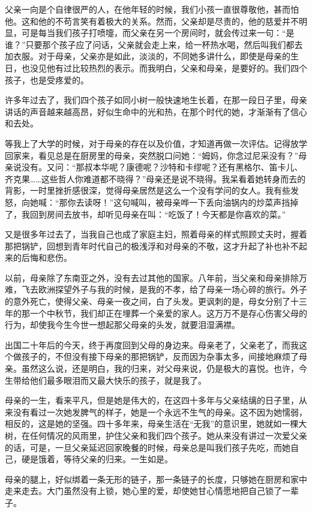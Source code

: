 \par 父亲一向是个自律很严的人，在他年轻的时候，我们小孩一直很尊敬他，甚而怕他。这和他的不苟言笑有着极大的关系。然而，父亲却是尽责的，他的慈爱并不明显，可是每当我们孩子打喷嚏，而父亲在另一个房间时，就会传过来一句：“是谁？”只要那个孩子应了问话，父亲就会走上来，给一杯热水喝，然后叫我们都去加衣服。对于母亲，父亲亦是如此，淡淡的，不同她多讲什么，即使是母亲的生日，也没见他有过比较热烈的表示。而我明白，父亲和母亲，是要好的。我们四个孩子，也是受疼爱的。
\par 许多年过去了，我们四个孩子如同小树一般快速地生长着，在那一段日子里，母亲讲话的声音越来越高昂，好似生命中的光和热，在那个时代的她，才渐渐有了信心和去处。
\par 等我上了大学的时候，对于母亲的存在以及价值，才知道再做一次评估。记得放学回家来，看见总是在厨房里的母亲，突然脱口问她：“姆妈，你念过尼采没有？”母亲说没有。又问：“那叔本华呢？康德呢？沙特和卡缪呢？还有黑格尔、笛卡儿、齐克果……这些哲人你难道都不晓得？”母亲还是说不晓得。我呆看着她转身而去的背影，一时里挫折感很深，觉得母亲居然是这么一个没有学问的女人。我有些发怒，向她喊：“那你去读呀！”这句喊叫，被母亲哗一下丢向油锅内的炒菜声挡掉了，我回到房间去放书，却听见母亲在叫：“吃饭了！今天都是你喜欢的菜。”
\par 又是很多年过去了，当我自己也成了家庭主妇，照着母亲的样式照顾丈夫时，握着那把锅铲，回想到青年时代自己的极浅浮和对母亲的不敬，这才升起了补也补不起来的后悔和悲伤。
\par 以前，母亲除了东南亚之外，没有去过其他的国家。八年前，当父亲和母亲排除万难，飞去欧洲探望外子与我的时候，是我的不孝，给了母亲一场心碎的旅行。外子的意外死亡，使得父亲、母亲一夜之间，白了头发。更讽刺的是，母女分别了十三年的那一个中秋节，我们却正在埋葬一个亲爱的家人。这万万不是存心伤害父母的行为，却使我今生今世一想起那父母亲的头发，就要泪湿满襟。
\par 出国二十年后的今天，终于再度回到父母的身边来。母亲老了，父亲老了，而我这个做孩子的，不但没有接下母亲的那把锅铲，反而因为杂事太多，间接地麻烦了母亲。虽然这么说，还是明白，我的归来，对父母来说，仍是极大的喜悦。也许，今生带给他们最多眼泪而又最大快乐的孩子，就是我了。
\par 母亲的一生，看来平凡，但是她是伟大的，在这四十多年与父亲结缡的日子里，从来没有看过一次她发脾气的样子，她是一个永远不生气的母亲。这不因为她懦弱，相反的，这是她的坚强。四十多年来，母亲生活在“无我”的意识里，她就如一棵大树，在任何情况的风雨里，护住父亲和我们四个孩子。她从来没有讲过一次爱父亲的话，可是，一旦父亲延迟回家晚餐的时候，母亲总是叫我们孩子先吃，而她自己，硬是饿着，等待父亲的归来。一生如是。
\par 母亲的腿上，好似绑着一条无形的链子，那一条链子的长度，只够她在厨房和家中走来走去。大门虽然没有上锁，她心里的爱，却使她甘心情愿地把自己锁了一辈子。
